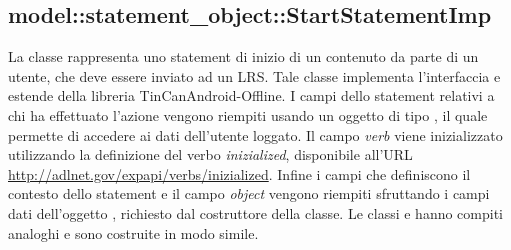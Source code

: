 \documentclass[../Tesi.tex]{subfiles}
\begin{document}
		\subsection{model::statement\_object::StartStatementImp}
		La classe  rappresenta uno statement di inizio di un contenuto da parte di un utente, che deve essere inviato ad un LRS. Tale classe implementa l'interfaccia  e estende  della libreria TinCanAndroid-Offline. I campi dello statement relativi a chi ha effettuato l'azione vengono riempiti usando un oggetto di tipo , il quale permette di accedere ai dati dell'utente loggato. Il campo \textit{verb} viene inizializzato utilizzando la definizione del verbo \textit{inizialized}, disponibile all'URL \url{http://adlnet.gov/expapi/verbs/inizialized}. Infine i campi che definiscono il contesto dello statement e il campo \textit{object} vengono riempiti sfruttando i campi dati dell'oggetto , richiesto dal costruttore della classe. Le classi  e  hanno compiti analoghi e sono costruite in modo simile.
\end{document}
